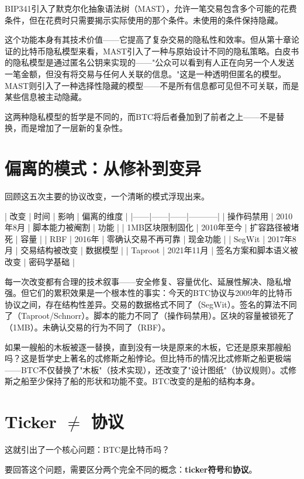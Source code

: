 \documentclass[a4paper,12pt,openany]{ctexbook}
\begin{document}
BIP341引入了默克尔化抽象语法树（MAST），允许一笔交易包含多个可能的花费条件，但在花费时只需要揭示实际使用的那个条件。未使用的条件保持隐藏。

这个功能本身有其技术价值——它提高了复杂交易的隐私性和效率。但从第十章论证的比特币隐私模型来看，MAST引入了一种与原始设计不同的隐私策略。白皮书的隐私模型是通过匿名公钥来实现的——"公众可以看到有人正在向另一个人发送一笔金额，但没有将交易与任何人关联的信息。"这是一种透明但匿名的模型。MAST则引入了一种选择性隐藏的模型——不是所有信息都可见但不可关联，而是某些信息被主动隐藏。

这两种隐私模型的哲学是不同的，而BTC将后者叠加到了前者之上——不是替换，而是增加了一层新的复杂性。


\section*{偏离的模式：从修补到变异}


回顾这五次主要的协议改变，一个清晰的模式浮现出来。

| 改变 | 时间 | 影响 | 偏离的维度 |
|------|------|------|-----------|
| 操作码禁用 | 2010年8月 | 脚本能力被阉割 | 功能 |
| 1MB区块限制固化 | 2010年至今 | 扩容路径被堵死 | 容量 |
| RBF | 2016年 | 零确认交易不再可靠 | 现金功能 |
| SegWit | 2017年8月 | 交易结构被改变 | 数据模型 |
| Taproot | 2021年11月 | 签名方案和脚本语义被改变 | 密码学基础 |

每一次改变都有合理的技术叙事——安全修复、容量优化、延展性解决、隐私增强。但它们的累积效果是一个根本性的事实：今天的BTC协议与2009年的比特币协议之间，存在结构性差异。交易的数据格式不同了（SegWit）。签名的算法不同了（Taproot/Schnorr）。脚本的能力不同了（操作码禁用）。区块的容量被锁死了（1MB）。未确认交易的行为不同了（RBF）。

如果一艘船的木板被逐一替换，直到没有一块是原来的木板，它还是原来那艘船吗？这是哲学史上著名的忒修斯之船悖论。但比特币的情况比忒修斯之船更极端——BTC不仅替换了"木板"（技术实现），还改变了"设计图纸"（协议规则）。忒修斯之船至少保持了船的形状和功能不变。BTC改变的是船的结构本身。


\section*{Ticker $\neq$ 协议}


这就引出了一个核心问题：BTC是比特币吗？

要回答这个问题，需要区分两个完全不同的概念：\textbf{ticker符号}和\textbf{协议}。
\end{document}
